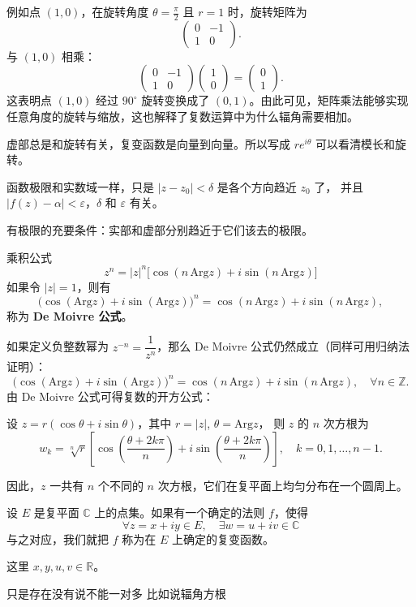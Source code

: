 \documentclass[lang=cn,10pt]{elegantbook}
\begin{document}
例如点 $(1,0)$，在旋转角度 $\theta = \tfrac{\pi}{2}$ 且 $r=1$ 时，旋转矩阵为
\[
\begin{pmatrix}
0 & -1 \\
1 & 0
\end{pmatrix}.
\]
与 $(1,0)$ 相乘：
\[
\begin{pmatrix}
0 & -1 \\
1 & 0
\end{pmatrix}
\begin{pmatrix}
1 \\ 0
\end{pmatrix}
=
\begin{pmatrix}
0 \\ 1
\end{pmatrix}.
\]
这表明点 $(1,0)$ 经过 $90^\circ$ 旋转变换成了 $(0,1)$。由此可见，矩阵乘法能够实现任意角度的旋转与缩放，这也解释了复数运算中为什么辐角需要相加。
\begin{dxtips}[最重要tip]
    虚部总是和旋转有关，复变函数是向量到向量。所以写成 $re^{i\theta}$ 可以看清模长和旋转。

函数极限和实数域一样，只是 $|z-z_0|<\delta$ 是各个方向趋近 $z_0$ 了，
并且 $|f(z)-\alpha|<\varepsilon$，$\delta$ 和 $\varepsilon$ 有关。

有极限的充要条件：实部和虚部分别趋近于它们该去的极限。
\end{dxtips}
\begin{theorem}[乘幂与开方]
   乘积公式
\[
z^n = |z|^n \bigl[\cos(n \,\mathrm{Arg}z) + i \sin(n \,\mathrm{Arg}z)\bigr]
\]
如果令 $|z|=1$，则有
\[
\bigl(\cos(\mathrm{Arg}z) + i \sin(\mathrm{Arg}z)\bigr)^n 
= \cos(n \,\mathrm{Arg}z) + i \sin(n \,\mathrm{Arg}z),
\]
称为 \textbf{De Moivre 公式}。  

如果定义负整数幂为 $z^{-n} = \dfrac{1}{z^n}$，那么 De Moivre 公式仍然成立（同样可用归纳法证明）：  
\[
\bigl(\cos(\mathrm{Arg}z) + i \sin(\mathrm{Arg}z)\bigr)^n 
= \cos(n \,\mathrm{Arg}z) + i \sin(n \,\mathrm{Arg}z), 
\quad \forall n \in \mathbb{Z}.
\] 
由 De Moivre 公式可得复数的开方公式：  

设 $z = r(\cos \theta + i \sin \theta)$，其中 $r=|z|$, $\theta = \mathrm{Arg}z$，  
则 $z$ 的 $n$ 次方根为
\[
w_k = \sqrt[n]{r}\left[\cos\!\left(\frac{\theta + 2k\pi}{n}\right) 
+ i \sin\!\left(\frac{\theta + 2k\pi}{n}\right)\right], 
\quad k=0,1,\dots,n-1.
\]

因此，$z$ 一共有 $n$ 个不同的 $n$ 次方根，它们在复平面上均匀分布在一个圆周上。
\end{theorem}
\begin{definition}
设 $E$ 是复平面 $\mathbb{C}$ 上的点集。如果有一个确定的法则 $f$，使得  
\[
\forall z = x + iy \in E, \quad \exists w = u + iv \in \mathbb{C}
\]
与之对应，我们就把 $f$ 称为在 $E$ 上确定的复变函数。  

这里 $x, y, u, v \in \mathbb{R}$。
\end{definition}
只是存在没有说不能一对多 比如说辐角方根
\end{document}
